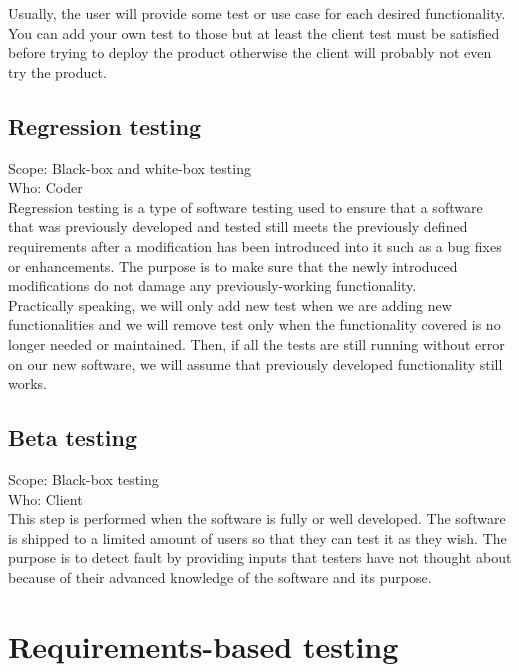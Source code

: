 \documentclass[12pt]{article}
\theoremstyle{definition}
\theoremstyle{definition}
\theoremstyle{remark}
\begin{document}
Usually, the user will provide some test or use case for each desired functionality. You can add your own test to those but at least the client test must be satisfied before trying to deploy the product otherwise the client will probably not even try the product.


\subsection{Regression testing}

Scope: Black-box and white-box testing\\
Who: Coder\\

Regression testing is a type of software testing used to ensure that a software that was previously developed and tested still meets the previously defined requirements after a modification has been introduced into it such as a bug fixes or enhancements. The purpose is to make sure that the newly introduced modifications do not damage any previously-working functionality.\\

Practically speaking, we will only add new test when we are adding new functionalities and we will remove test only when the functionality covered is no longer needed or maintained. Then, if all the tests are still running without error on our new software, we will assume that previously developed functionality still works.


\subsection{Beta testing}

Scope: Black-box testing\\
Who: Client\\

This step is performed when the software is fully or well developed. The software is shipped to a limited amount of users so that they can test it as they wish. The purpose is to detect fault by providing inputs that testers have not thought about because of their advanced knowledge of the software and its purpose.



\section{Requirements-based testing}
\end{document}
